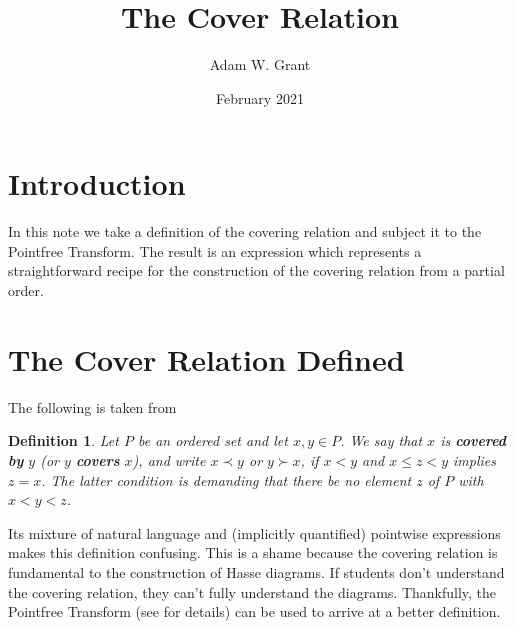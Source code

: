 \documentclass{article}
\title{The Cover Relation}
\author{Adam W. Grant}
\date{February 2021}
\newtheorem*{defn}{Definition}
\begin{document}
\maketitle

\section{Introduction}

In this note we take a definition of the covering relation and subject it to the Pointfree Transform.  The result is an expression which represents a straightforward recipe for the construction of the covering relation from a partial order.

\section{The Cover Relation Defined}
The following is taken from \cite{davey_priestley_2002}
\begin{defn}
Let $P$ be an ordered set and let $x,y \in P$.  We say that $x$ is \textbf{covered by} $y$ (or $y$ \textbf{covers} $x$), and write $x \prec y$ or $y \succ x$, if $x <y$ and $x \leq z < y$ implies $z = x$.  The latter condition is demanding that there be no element $z$ of $P$ with $x < y < z$.
\end{defn}
Its mixture of natural language and (implicitly quantified) pointwise expressions makes this definition confusing.  This is a shame because the covering relation is fundamental to the construction of Hasse diagrams.  If students don't understand the covering relation, they can't fully understand the diagrams.  Thankfully, the Pointfree Transform (see \cite{Oliveira2009} for details) can be used to arrive at a better definition.
\end{document}
